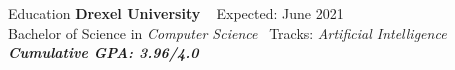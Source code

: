 \documentclass{resume} %
\begin{document}

\begin{rSection}{Education}
{\bf Drexel University}  
\hfill {Expected: June 2021} \\ 
Bachelor of Science in \textit{Computer Science }
\hfill  {Tracks: \textit{Artificial Intelligence}} \\
{\bf \em Cumulative GPA: 3.96/4.0}

\end{rSection}

\end{document}
